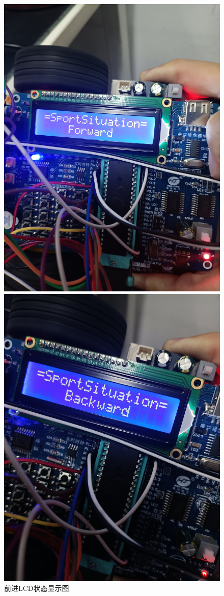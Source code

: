 \begin{figure}[htbp]
	\centering
	\begin{minipage}{0.49\linewidth}
		\centering
		\includegraphics[width=0.9\linewidth]{figures/forward.jpg}
		\caption{前进LCD状态显示图}
		\label{forward}%
	\end{minipage}
	\begin{minipage}{0.49\linewidth}
		\centering
		\includegraphics[width=0.9\linewidth]{figures/backward.jpg}

\end{minipage}
\end{figure}

